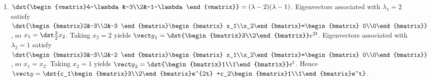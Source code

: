\documentclass[openany]{book}
\newenvironment{sectionSolutions}{
 \begin{enumerate}[item-label={\thesection.\arabic{enumi}.}]
}{
 \end{enumerate}
}
\begin{document}
\begin{sectionSolutions}
\item
$\dst{\begin{vmatrix}4-\lambda&-3\\2&-1-\lambda\end{vmatrix}}
=(\lambda-2)(\lambda-1)$.
Eigenvectors  associated with $\lambda_1=2$  satisfy
$\dst{\begin{bmatrix}2&-3\\2&-3
\end{bmatrix}\begin{bmatrix}
x_1\\x_2\end{bmatrix}=\begin{bmatrix} 0\\0\end{bmatrix}}$,
so $x_1=\dst\frac{3}{2}x_2$.  Taking $x_2=2$ yields
${\vect y}_1=\dst{\begin{bmatrix}3\\2\end{bmatrix}}e^{2t}$.
Eigenvectors  associated with $\lambda_2=1$ satisfy
$\dst{\begin{bmatrix}3&-3\\2&-2
\end{bmatrix}\begin{bmatrix}
x_1\\x_2\end{bmatrix}=\begin{bmatrix} 0\\0\end{bmatrix}}$,
so $x_1=x_2$.  Taking $x_2=1$ yields
${\vect y}_2=\dst{\begin{bmatrix}1\\1\end{bmatrix}}e^t$.
Hence
 ${\vect y}=\dst{c_1\begin{bmatrix}3\\2\end{bmatrix}e^{2t}
 +c_2\begin{bmatrix}1\\1\end{bmatrix}e^t}$.



\end{sectionSolutions}
\end{document}

